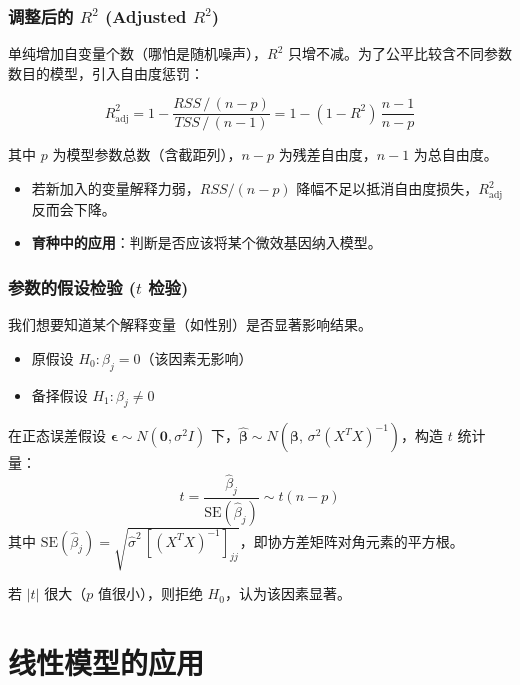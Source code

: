 
\begin{frame}
\frametitle{调整后的 $R^2$ (Adjusted $R^2$)}

单纯增加自变量个数（哪怕是随机噪声），$R^2$ 只增不减。为了公平比较含不同参数数目的模型，引入自由度惩罚：

\[
R^2_{\text{adj}} = 1 - \frac{RSS\,/\,(n-p)}{TSS\,/\,(n-1)} = 1 - (1 - R^2)\,\frac{n-1}{n-p}
\]

其中 $p$ 为模型参数总数（含截距列），$n-p$ 为残差自由度，$n-1$ 为总自由度。

\begin{itemize}
    \item 若新加入的变量解释力弱，$RSS/(n-p)$ 降幅不足以抵消自由度损失，$R^2_{\text{adj}}$ 反而会下降。
    \item \textbf{育种中的应用}：判断是否应该将某个微效基因纳入模型。
\end{itemize}

\end{frame}


\begin{frame}
\frametitle{参数的假设检验 ($t$ 检验)}

我们想要知道某个解释变量（如性别）是否显著影响结果。
\begin{itemize}
    \item 原假设 $H_0: \beta_j = 0$（该因素无影响）
    \item 备择假设 $H_1: \beta_j \neq 0$
\end{itemize}

在正态误差假设 $\boldsymbol{\epsilon} \sim N(\mathbf{0}, \sigma^2 I)$ 下，$\hat{\boldsymbol{\beta}} \sim N\!\left(\boldsymbol{\beta},\, \sigma^2 (X^TX)^{-1}\right)$，构造 $t$ 统计量：
\[
t = \frac{\hat{\beta}_j}{\mathrm{SE}(\hat{\beta}_j)} \sim t(n-p)
\]
其中 $\mathrm{SE}(\hat{\beta}_j) = \sqrt{\hat{\sigma}^2\,[(X^TX)^{-1}]_{jj}}$，即协方差矩阵对角元素的平方根。

若 $|t|$ 很大（$p$ 值很小），则拒绝 $H_0$，认为该因素显著。

\end{frame}


\section[应用]{线性模型的应用}


